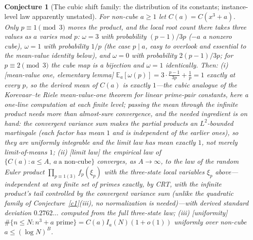\documentclass[11pt]{article}
\newtheorem{conjecture}{Conjecture}
\theoremstyle{definition}
\begin{document}
\setcounter{conjecture}{14}%
\begin{conjecture}[The cubic shift family: the distribution of its
constants; instance-level law apparently unstated]\label{c2}
For non-cube $a\ge1$ let $C(a)=C(x^3+a)$.  Only $p\equiv1\pmod3$
moves the product, and the local root count there takes \emph{three}
values as $a$ varies mod $p$:
$\omega=3$ with probability $(p-1)/3p$ ($-a$ a nonzero cube),
$\omega=1$ with probability $1/p$ (the case $p\mid a$, easy to
overlook and essential to the mean-value identity below), and
$\omega=0$ with probability
$2(p-1)/3p$; for $p\equiv2\pmod 3$ the cube map is a bijection and
$\omega=1$ identically.  Then:
\emph{(i)} [mean-value one, elementary lemma]
$\mathbb E_a[\omega(p)]=3\cdot\frac{p-1}{3p}+\frac1p=1$ exactly at
every $p$, so the derived mean of $C(a)$ is exactly $1$---the cubic
analogue of the Korevaar--te Riele mean-value-one theorem for linear
prime-pair constants, here a one-line computation
at each finite level; passing the mean through the infinite product
needs more than almost-sure convergence, and the needed ingredient is
on hand: the convergent
variance sum makes the partial products an $L^2$-bounded martingale
(each factor has mean $1$ and is independent of the earlier ones),
so they are uniformly integrable and the limit law has mean exactly
$1$, not merely limit-of-means $1$;
\emph{(ii)} [limit law] the empirical law of $\{C(a):a\le A,\ a\ \text{a non-cube}\}$ converges, as $A\to\infty$, to the law of the random Euler product
$\prod_{p\equiv1(3)}f_p(\xi_p)$ with the three-state local variables
$\xi_p$ above---independent at any finite set of primes exactly, by
CRT, with the infinite product's tail controlled by the convergent
variance sum (unlike the quadratic family of
Conjecture~\ref{c1}(iii), no normalization is needed)---with derived
standard deviation $0.2762\ldots$ computed from the full three-state
law;
\emph{(iii)} [uniformity] $\#\{n\le N: n^3+a \text{ prime}\}
=C(a)I_a(N)(1+o(1))$ uniformly over non-cube $a\le(\log N)^B$.
\end{conjecture}
\end{document}
